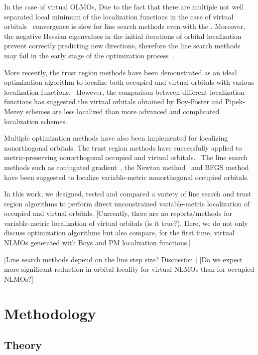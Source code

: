 \documentclass[aps,prl,reprint,amsmath,amssymb]{revtex4-1}
\begin{document}
In the case of virtual OLMOs, 
Due to the fact that there are multiple not well separated local minimum of the localization functions in the case of virtual orbitals~\cite{subotnik2005fast} convergence is slow for line search methods even with the .
Moreover, the negative Hessian eigenvalues in the initial iterations of orbital localization prevent correctly predicting new directions, therefore the line search methods may fail in the early stage of the optimization process~\cite{RZK-citation-is-needed}.

More recently, the trust region methods have been demonstrated as an ideal optimization algorithm to localize both occupied and virtual orbitals with various localization functions.~\cite{jansik2011local, hoyvik2012trust, hoyvik2012orbital, hoyvik2013pipek}
However, the comparison between different localization functions has suggested the virtual orbitals obtained by Boy-Foster and Pipek-Mezey schemes are less localized than more advanced and complicated localization schemes.~\cite{hoyvik2013localized} 

Multiple optimization methods have also been implemented for localizing nonorthogonal orbitals.
The trust region methods have successfully applied to metric-preserving nonorthogonal occupied and virtual orbitals.~\cite{hoyvik2017generalising}
The line search methods such as conjugated gradient~\cite{liu2000nonorthogonal}, the Newton method~\cite{feng2004An_efficient} and BFGS method~\cite{cui2010efficient} have been suggested to localize variable-metric nonorthogonal occupied orbitals.

In this work, we designed, tested and compared a variety of line search and trust region algorithms to perform direct unconstrained variable-metric localization of occupied and virtual orbitals. [Currently, there are no reports/methods for variable-metric localization of virtual orbitals (is it true?). Here, we do not only discuss optimization algorithms but also compare, for the first time, virtual NLMOs generated with Boys and PM localization functions.]

[Line search methods depend on the line step size? Discussion ]
[Do we expect more significant reduction in orbital locality for virtual NLMOs than for occupied NLMOs?]

\section{Methodology}

\subsection{Theory}
\end{document}
